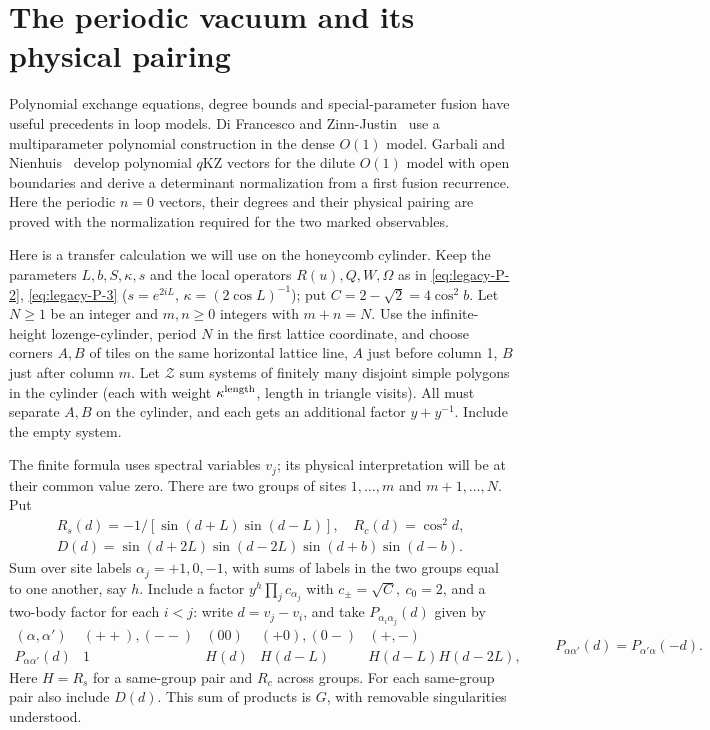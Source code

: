 \section{The periodic vacuum and its physical pairing}\label{c6:periodic-polynomial}

Polynomial exchange equations, degree bounds and special-parameter fusion have useful precedents in loop models. Di Francesco and Zinn-Justin~\cite{DiFrancescoZinnJustin2005} use a multiparameter polynomial construction in the dense $O(1)$ model. Garbali and Nienhuis~\cite{GarbaliNienhuis2017Ground,GarbaliNienhuis2017Sum} develop polynomial $q$KZ vectors for the dilute $O(1)$ model with open boundaries and derive a determinant normalization from a first fusion recurrence. Here the periodic $n=0$ vectors, their degrees and their physical pairing are proved with the normalization required for the two marked observables.


Here is a transfer calculation we will use on the honeycomb cylinder. Keep the parameters $L,b,S,\kappa,s$ and the local operators $R(u),Q,W,\Omega$ as in \eqref{eq:legacy-P-2}, \eqref{eq:legacy-P-3} (\(s=e^{2iL}\), \(\kappa=(2\cos L)^{-1}\)); put \(C=2-\sqrt 2=4\cos^2 b\). Let \(N\ge1\) be an integer and \(m,n\ge0\) integers with \(m+n=N\). Use the infinite-height lozenge-cylinder, period \(N\) in the first lattice coordinate, and choose corners \(A,B\) of tiles on the same horizontal lattice line, \(A\) just before column 1, \(B\) just after column \(m\). Let \(\mathcal Z\) sum systems of finitely many disjoint simple polygons in the cylinder (each with weight \(\kappa^{\rm length}\), length in triangle visits). All must separate \(A,B\) on the cylinder, and each gets an additional factor \(y+y^{-1}\). Include the empty system.

The finite formula uses spectral variables \(v_j\); its physical interpretation will be at their common value zero. There are two groups of sites \(1,\ldots,m\) and \(m+1,\ldots,N\). Put
\[
 \begin{gathered}
 R_s(d)=-1/[\sin(d+L)\sin(d-L)],\quad R_c(d)=\cos^2 d,\\
 D(d)=\sin(d+2L)\sin(d-2L)\sin(d+b)\sin(d-b).
 \end{gathered}
\]
Sum over site labels \(\alpha_j=+1,0,-1\), with sums of labels in the two groups equal to one another, say \(h\). Include a factor \(y^h\prod_j c_{\alpha_j}\) with \(c_\pm=\sqrt C,\ c_0=2\), and a two-body factor for each \(i<j\): write \(d=v_j-v_i\), and take \(P_{\alpha_i\alpha_j}(d)\) given by
\[
 \begin{array}{c|cccc}
 (\alpha,\alpha') &(++),(--)&(00)&(+0),(0-)& (+,-)\\ \hline
 P_{\alpha\alpha'}(d)&1&H(d)&H(d-L)&H(d-L)H(d-2L),
 \end{array}\qquad P_{\alpha\alpha'}(d)=P_{\alpha'\alpha}(-d).
\]
Here \(H=R_s\) for a same-group pair and \(R_c\) across groups. For each same-group pair also include \(D(d)\). This sum of products is \(G\), with removable singularities understood.

